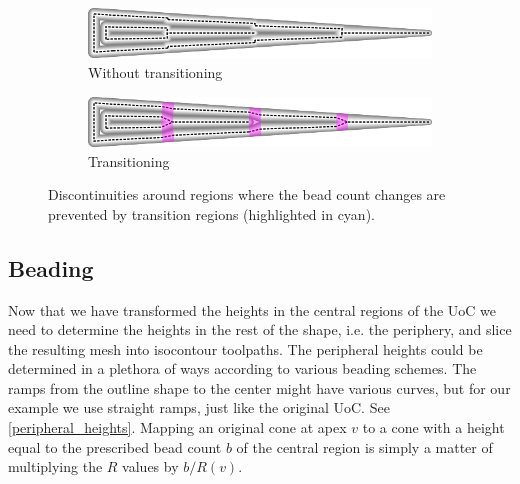 \begin{figure}
\centering
\setlength{\figwidth}{\columnwidth}
\begin{subfigure}{0.9\figwidth}\centering
\includegraphics[width=\columnwidth]{sources/method/wedge_no_transitioning.png}
\caption{Without transitioning}
\end{subfigure}
\begin{subfigure}{0.9\figwidth}\centering
\includegraphics[width=\columnwidth]{sources/method/wedge_transitioning.png}
\caption{Transitioning}
\end{subfigure}
\caption{
Discontinuities around regions where the bead count changes are prevented by transition regions (highlighted in cyan).
}
\label{transitions}
\end{figure}














\subsection{Beading}\label{sec_peripheral_height_adjustment}

Now that we have transformed the heights in the central regions of the UoC we need to determine the heights in the rest of the shape, i.e. the periphery, and slice the resulting mesh into isocontour toolpaths.
The peripheral heights could be determined in a plethora of ways according to various beading schemes.
The ramps from the outline shape to the center might have various curves,
but for our example we use straight ramps, just like the original UoC.
See \cref{peripheral_heights}.
Mapping an original cone at apex $v$ to a cone with a height equal to the prescribed bead count $b$ of the central region is simply a matter of multiplying the $R$ values by $b / R(v)$.


